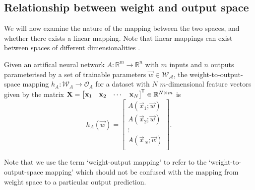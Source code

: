 \subsection{Relationship between weight and output space}
We will now examine the nature of the mapping between the two spaces, and whether there exists a linear mapping. 
Note that linear mappings can exist between spaces of different dimensionalities \cite{rudin2006}.

\begin{definition}
    \label{def:weight_output_space_mapping}
    Given an artifical neural network $A:\mathbb{R}^m \rightarrow \mathbb{R}^n$ with $m$ inputs and $n$ outputs parameterised by a set of trainable parameters $\vec{w} \in \mathcal{W_A}$,
    the weight-to-output-space mapping $h_A: \mathcal{W}_A \rightarrow \mathcal{O}_A$ for a dataset with $N$ $m$-dimensional feature vectors given by the matrix
    $\mathbf{X} = \begin{bmatrix}
        \mathbf{x}_1 & \mathbf{x}_2 & \cdots & \mathbf{x}_N
    \end{bmatrix}^{\mkern-1.5mu\mathsf{T}} \in \mathbb{R}^{N\times m}$
    is
    \begin{equation*}
        h_A \left( \vec{w} \right)
        = \begin{bmatrix}
            A(\vec{x}_1; \vec{w} ) \\
            A(\vec{x}_2; \vec{w} ) \\
            \vdots \\
            A(\vec{x}_N; \vec{w} ) \\
        \end{bmatrix}.
    \end{equation*}

    Note that we use the term `weight-output mapping' to refer to the `weight-to-output-space mapping' which should not be confused with the mapping from weight space to a particular output prediction. 
\end{definition}

